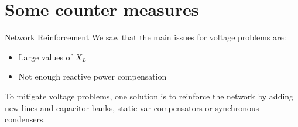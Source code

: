 \section{Some counter measures}

\begin{frame}{Network Reinforcement}
We saw that the main issues for voltage problems are:
\begin{itemize}
    \item Large values of $X_L$
    \item Not enough reactive power compensation
\end{itemize}
To mitigate voltage problems, one solution is to reinforce the network by adding new lines and capacitor banks, static var compensators or synchronous condensers.
\end{frame}

